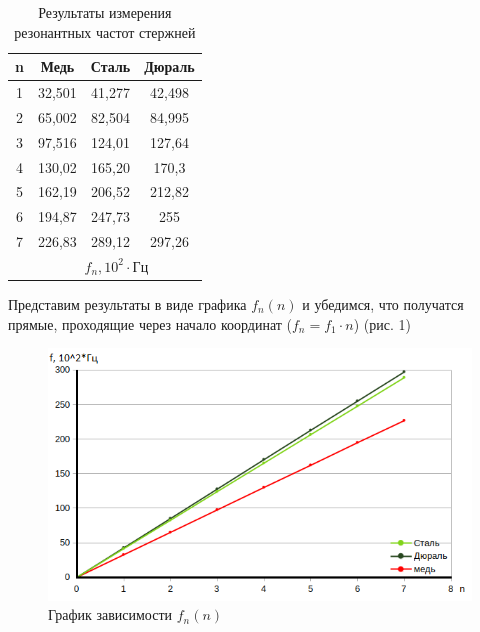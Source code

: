 \documentclass[a4paper, 12pt]{article}
\begin{document}
    \begin{table}[h]
    \centering
    \begin{tabular}{|c|ccc|}
    \hline
    n & \multicolumn{1}{c|}{Медь}   & \multicolumn{1}{c|}{Сталь}  & Дюраль \\ \hline
    1 & \multicolumn{1}{c|}{32,501} & \multicolumn{1}{c|}{41,277} & 42,498 \\ \hline
    2 & \multicolumn{1}{c|}{65,002} & \multicolumn{1}{c|}{82,504} & 84,995 \\ \hline
    3 & \multicolumn{1}{c|}{97,516} & \multicolumn{1}{c|}{124,01} & 127,64 \\ \hline
    4 & \multicolumn{1}{c|}{130,02} & \multicolumn{1}{c|}{165,20}  & 170,3  \\ \hline
    5 & \multicolumn{1}{c|}{162,19} & \multicolumn{1}{c|}{206,52} & 212,82 \\ \hline
    6 & \multicolumn{1}{c|}{194,87} & \multicolumn{1}{c|}{247,73} & 255    \\ \hline
    7 & \multicolumn{1}{c|}{226,83} & \multicolumn{1}{c|}{289,12} & 297,26 \\ \hline
      & \multicolumn{3}{c|}{$f_n, 10^2 \cdot Гц$}                                  \\ \hline
    \end{tabular}
    \caption{Результаты измерения резонантных частот стержней}
    \end{table}

    Представим результаты в виде графика $f_n(n)$ и убедимся, что получатся прямые, проходящие через начало координат ($f_n = f_1 \cdot n$) (рис. 1)
    \begin{figure}[h]
        \centering
        \includegraphics[scale=1.00]{graph.png}
        \caption{График зависимости $f_n(n)$}
        \label{fig:enter-label}
    \end{figure}
\end{document}
